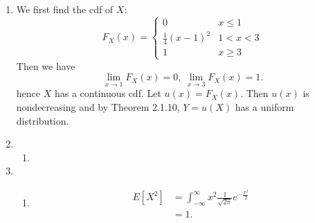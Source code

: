 \documentclass{article}
\begin{document}
\begin{enumerate}
    \item We first find the cdf of $X$:
    \[ F_{X}(x) = \begin{cases}
        0 & x \leq 1 \\
        \frac{1}{4}(x - 1)^2 & 1 < x < 3 \\
        1 & x \geq 3
    \end{cases} \]
    Then we have 
    \[ \lim_{x \to 1} F_{X}(x) = 0, \ \lim_{x \to 3} F_{X}(x) = 1. \]
    hence $X$ has a continuous cdf. Let $u(x) = F_{X}(x)$. Then $u(x)$ is nondecreasing and by Theorem 2.1.10, 
    $Y = u(X)$ has a uniform distribution.

    \item \begin{enumerate}
        \item 
    \end{enumerate}

    \item \begin{enumerate}
        \item \begin{align*}
            E[X^2]
            &= \int_{-\infty}^{\infty} x^2 \frac{1}{\sqrt{2\pi}}e^{-\frac{x^2}{2}} \\
            &= 1.
        \end{align*}
    \end{enumerate}
\end{enumerate}
\end{document}
